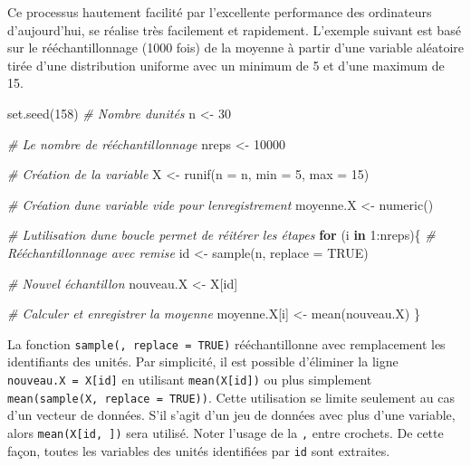 \documentclass[
]{book}
\newenvironment{Shaded}{}{}
\newcommand{\AttributeTok}[1]{#1}
\newcommand{\CommentTok}[1]{\textit{#1}}
\newcommand{\ConstantTok}[1]{#1}
\newcommand{\ControlFlowTok}[1]{\textbf{#1}}
\newcommand{\DecValTok}[1]{#1}
\newcommand{\FunctionTok}[1]{#1}
\newcommand{\NormalTok}[1]{#1}
\newcommand{\OtherTok}[1]{#1}
\newcommand{\SpecialCharTok}[1]{#1}
\begin{document}
Ce processus hautement facilité par l'excellente performance des ordinateurs d'aujourd'hui, se réalise très facilement et rapidement. L'exemple suivant est basé sur le rééchantillonnage (1000 fois) de la moyenne à partir d'une variable aléatoire tirée d'une distribution uniforme avec un minimum de 5 et d'une maximum de 15.

\begin{Shaded}
\begin{Highlighting}[]
\FunctionTok{set.seed}\NormalTok{(}\DecValTok{158}\NormalTok{)}
\CommentTok{\# Nombre d\textquotesingle{}unités}
\NormalTok{n }\OtherTok{\textless{}{-}} \DecValTok{30}

\CommentTok{\# Le nombre de rééchantillonnage}
\NormalTok{nreps }\OtherTok{\textless{}{-}} \DecValTok{10000}

\CommentTok{\# Création de la variable}
\NormalTok{X }\OtherTok{\textless{}{-}} \FunctionTok{runif}\NormalTok{(}\AttributeTok{n =}\NormalTok{ n, }\AttributeTok{min =} \DecValTok{5}\NormalTok{, }\AttributeTok{max =} \DecValTok{15}\NormalTok{)}

\CommentTok{\# Création d\textquotesingle{}une variable vide pour l\textquotesingle{}enregistrement}
\NormalTok{moyenne.X }\OtherTok{\textless{}{-}} \FunctionTok{numeric}\NormalTok{()}

\CommentTok{\# L\textquotesingle{}utilisation d\textquotesingle{}une boucle permet de réitérer les étapes}
\ControlFlowTok{for}\NormalTok{ (i }\ControlFlowTok{in} \DecValTok{1}\SpecialCharTok{:}\NormalTok{nreps)\{}
  \CommentTok{\# Rééchantillonnage avec remise}
\NormalTok{  id }\OtherTok{\textless{}{-}} \FunctionTok{sample}\NormalTok{(n, }\AttributeTok{replace =} \ConstantTok{TRUE}\NormalTok{)}
  
  \CommentTok{\# Nouvel échantillon}
\NormalTok{  nouveau.X }\OtherTok{\textless{}{-}}\NormalTok{ X[id]}
  
  \CommentTok{\# Calculer et enregistrer la moyenne}
\NormalTok{  moyenne.X[i] }\OtherTok{\textless{}{-}} \FunctionTok{mean}\NormalTok{(nouveau.X)}
\NormalTok{\}}
\end{Highlighting}
\end{Shaded}

La fonction \texttt{sample(,\ replace\ =\ TRUE)} rééchantillonne avec remplacement les identifiants des unités. Par simplicité, il est possible d'éliminer la ligne \texttt{nouveau.X\ =\ X{[}id{]}} en utilisant \texttt{mean(X{[}id{]})} ou plus simplement \texttt{mean(sample(X,\ replace\ =\ TRUE))}. Cette utilisation se limite seulement au cas d'un vecteur de données. S'il s'agit d'un jeu de données avec plus d'une variable, alors \texttt{mean(X{[}id,\ {]})} sera utilisé. Noter l'usage de la \texttt{,} entre crochets. De cette façon, toutes les variables des unités identifiées par \texttt{id} sont extraites.
\end{document}
